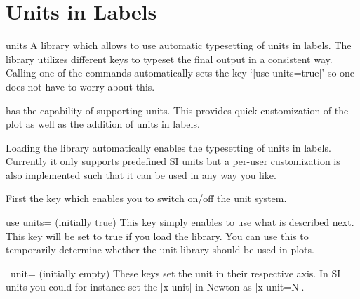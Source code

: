 
\section[libs.units]{Units in Labels}
\label{sec:units}

\begingroup
\def\pgfplotsmanualcurlibrary{units}

{}

\begin{pgfplotslibrary}{units}
    A library which allows to use automatic typesetting of units in labels. The
    library utilizes different keys to typeset the final output in a consistent
    way. Calling one of the commands automatically sets the key
    `|use units=true|' so one does not have to worry about this.
\end{pgfplotslibrary}

\PGFPlots{} has the capability of supporting units. This provides quick
customization of the plot as well as the addition of units in labels.

Loading the library automatically enables the typesetting of units in labels.
Currently it only supports predefined SI units but a per-user customization is
also implemented such that it can be used in any way you like.

First the key which enables you to switch on/off the unit system.

\begin{pgfplotskey}{use units= (initially true)}
    This key simply enables \PGFPlots{} to use what is described next. This key
    will be set to true if you load the library. You can use this to
    temporarily determine whether the unit library should be used in plots.
\end{pgfplotskey}

\begin{pgfplotsxykey}{\x\ unit= (initially empty)}
    These keys set the unit in their respective axis. In SI units you could for
    instance set the |x unit| in Newton as |x unit=N|.
\end{pgfplotsxykey}

